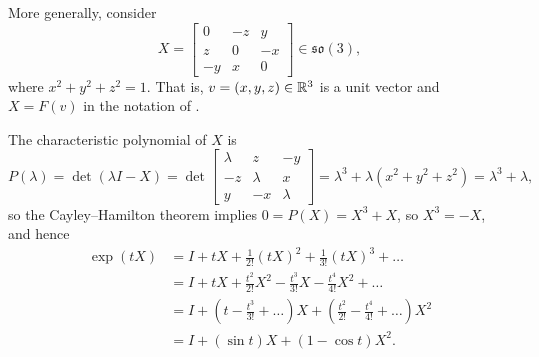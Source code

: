 \begin{example}\label{ex:general one-parameter subgroup of SO(3)}
	More generally, consider
	\[
		X = \begin{bmatrix} 0 & -z & y \\ z & 0 & -x \\ -y & x & 0 \end{bmatrix} \in \mathfrak{so}(3),
	\]
	where $x^2 + y^2 + z^2 = 1$. That is, $v = (x,y,z) \in \mathbb{R}^3$ is a unit vector and $X = F(v)$ in the notation of . 
	
	The characteristic polynomial of $X$ is
	\[
		P(\lambda) = \det(\lambda I - X) = \det \begin{bmatrix} \lambda & z & -y \\ -z & \lambda & x \\ y & -x & \lambda \end{bmatrix} = \lambda^3 + \lambda(x^2 + y^2 + z^2) = \lambda^3 + \lambda,
	\]
	so the Cayley–Hamilton theorem implies $0 = P(X) = X^3 + X$, so $X^3 = -X$, and hence
	\begin{align*}
		\exp(tX) & = I + tX + \frac{1}{2!} (tX)^2 + \frac{1}{3!} (tX)^3 + \dots \\
		& = I + tX + \frac{t^2}{2!} X^2 - \frac{t^3}{3!} X - \frac{t^4}{4!} X^2 + \dots \\
		& = I + \left(t - \frac{t^3}{3!} + \dots \right)X + \left(\frac{t^2}{2!} - \frac{t^4}{4!} + \dots \right)X^2 \\
		& = I + (\sin t) X + (1-\cos t)X^2.
	\end{align*}
	

\end{example}
